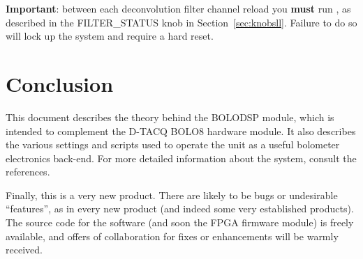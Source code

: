 \documentclass[12pt,a4paper]{article}
\begin{document}
\textbf{Important}: between each deconvolution filter channel reload you \textbf{must} run \mbox{}, as described in
the FILTER{\_}STATUS knob in Section~\ref{sec:knobsll}. Failure to do so will lock up the system and require a hard reset.

\section{Conclusion}
This document describes the theory behind the BOLODSP module, which is intended to complement the D-TACQ BOLO8 hardware module. It also describes the
various settings and scripts used to operate the unit as a useful bolometer electronics back-end. For more detailed information about the system, consult
the references.

Finally, this is a very new product. There are likely to be bugs or undesirable ``features'', as in every new product (and indeed some very established
products). The source code for the software (and soon the FPGA firmware module) is freely available, and offers of collaboration for fixes or enhancements
will be warmly received.



\end{document}
